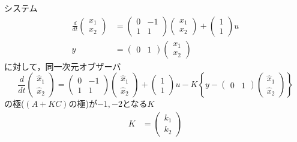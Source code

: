 システム
\begin{align}
 \frac{d}{dt}
 \left(
 \begin{array}{c}
  x_1 \\
  x_2
 \end{array}
 \right)
 &=
 \left(
 \begin{array}{cc}
  0 & -1 \\
  1 & 1
 \end{array}
 \right)
 \left(
 \begin{array}{c}
  x_1 \\
  x_2
 \end{array}
 \right) +
 \left(
 \begin{array}{c}
  1 \\
  1
 \end{array}
 \right) u \\
 y &=
 \left(
 \begin{array}{cc}
  0 & 1
 \end{array}
 \right)
 \left(
 \begin{array}{c}
  x_1 \\
  x_2
 \end{array}
 \right)
\end{align}
に対して，同一次元オブザーバ
\begin{equation}
 \frac{d}{dt}
 \left(
 \begin{array}{c}
  \hat{x}_1 \\
  \hat{x}_2
 \end{array}
 \right)
 =
 \left(
 \begin{array}{cc}
  0 & -1 \\
  1 & 1
 \end{array}
 \right)
 \left(
 \begin{array}{c}
  \hat{x}_1 \\
  \hat{x}_2
 \end{array}
 \right) +
 \left(
 \begin{array}{c}
  1 \\
  1
 \end{array}
 \right) u -
 K\left\{y - 
 \left(
 \begin{array}{cc}
  0 & 1
 \end{array}
 \right)
 \left(
 \begin{array}{c}
  \hat{x}_1 \\
  \hat{x}_2
 \end{array}
 \right)\right\}
\end{equation}
の極($(A+KC)$の極)が$-1, -2$となる$K$
\begin{align}
 K&=
 \left( 
 \begin{array}{c}
  k_1 \\
  k_2
 \end{array}
 \right)
\end{align}
